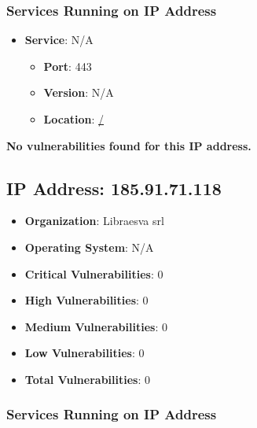 \documentclass{article}
\begin{document}
\subsubsection*{Services Running on IP Address}

\begin{itemize}
    
        \item \textbf{Service}: N/A
        \begin{itemize}
            \item \textbf{Port}: 443
            \item \textbf{Version}:  N/A 
            \item \textbf{Location}: \href{ / }{ / }
        \end{itemize}
    
\end{itemize}


\textbf{No vulnerabilities found for this IP address.}




\clearpage



\subsection*{IP Address: 185.91.71.118}

\begin{itemize}
    \item \textbf{Organization}: Libraesva srl
    \item \textbf{Operating System}:  N/A 
    \item \textbf{Critical Vulnerabilities}: 0
    \item \textbf{High Vulnerabilities}: 0
    \item \textbf{Medium Vulnerabilities}: 0
    \item \textbf{Low Vulnerabilities}: 0
    \item \textbf{Total Vulnerabilities}: 0
\end{itemize}

\subsubsection*{Services Running on IP Address}
\end{document}
